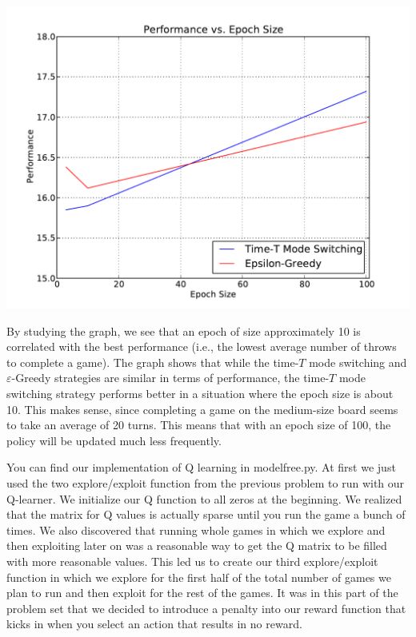 \documentclass[solution, letterpaper]{cs121}
\begin{document}
\begin{center}
\includegraphics[scale=0.8]{source/perf-v-epoch-size.pdf}
\end{center}

By studying the graph, we see that an epoch of size approximately 10 is correlated with the best performance (i.e., the lowest average number of throws to complete a game). The graph shows that while the time-$T$ mode switching and $\varepsilon$-Greedy strategies are similar in terms of performance, the time-$T$ mode switching strategy performs better in a situation where the epoch size is about 10. This makes sense, since completing a game on the medium-size board seems to take an average of 20 turns. This means that with an epoch size of 100, the policy will be updated much less frequently. 

\subproblem{} %
You can find our implementation of Q learning in modelfree.py. At first we just used the two explore/exploit function from the previous problem to run with our Q-learner. We initialize our Q function to all zeros at the beginning. We realized that the matrix for Q values is actually sparse until you run the game a bunch of times. We also discovered that running whole games in which we explore and then exploiting later on was a reasonable way to get the Q matrix to be filled with more reasonable values. This led us to create our third explore/exploit function in which we explore for the first half of the total number of games we plan to run and then exploit for the rest of the games.  It was in this part of the problem set that we decided to introduce a penalty into our reward function that kicks in when you select an action that results in no reward.
\end{document}

